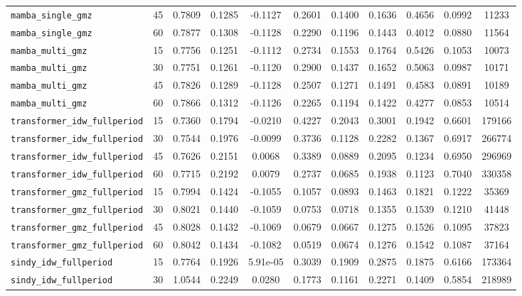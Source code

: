 \documentclass[12pt, a4paper]{article}
\begin{document}
{\begin{longtable}{p{4.0cm}cccccccccc}
\texttt{mamba\_single\_gmz} & 45 & 0.7809 & 0.1285 & -0.1127 & 0.2601 & 0.1400 & 0.1636 & 0.4656 & 0.0992 & 11233 \\
\texttt{mamba\_single\_gmz} & 60 & 0.7877 & 0.1308 & -0.1128 & 0.2290 & 0.1196 & 0.1443 & 0.4012 & 0.0880 & 11564 \\
\addlinespace[1pt]
\texttt{mamba\_multi\_gmz} & 15 & 0.7756 & 0.1251 & -0.1112 & 0.2734 & 0.1553 & 0.1764 & 0.5426 & 0.1053 & 10073 \\
\texttt{mamba\_multi\_gmz} & 30 & 0.7751 & 0.1261 & -0.1120 & 0.2900 & 0.1437 & 0.1652 & 0.5063 & 0.0987 & 10171 \\
\texttt{mamba\_multi\_gmz} & 45 & 0.7826 & 0.1289 & -0.1128 & 0.2507 & 0.1271 & 0.1491 & 0.4583 & 0.0891 & 10189 \\
\texttt{mamba\_multi\_gmz} & 60 & 0.7866 & 0.1312 & -0.1126 & 0.2265 & 0.1194 & 0.1422 & 0.4277 & 0.0853 & 10514 \\
\addlinespace[1pt]
\texttt{transformer\_idw\_fullperiod} & 15 & 0.7360 & 0.1794 & -0.0210 & 0.4227 & 0.2043 & 0.3001 & 0.1942 & 0.6601 & 179166 \\
\texttt{transformer\_idw\_fullperiod} & 30 & 0.7544 & 0.1976 & -0.0099 & 0.3736 & 0.1128 & 0.2282 & 0.1367 & 0.6917 & 266774 \\
\texttt{transformer\_idw\_fullperiod} & 45 & 0.7626 & 0.2151 & 0.0068 & 0.3389 & 0.0889 & 0.2095 & 0.1234 & 0.6950 & 296969 \\
\texttt{transformer\_idw\_fullperiod} & 60 & 0.7715 & 0.2192 & 0.0079 & 0.2737 & 0.0685 & 0.1938 & 0.1123 & 0.7040 & 330358 \\
\addlinespace[1pt]
\texttt{transformer\_gmz\_fullperiod} & 15 & 0.7994 & 0.1424 & -0.1055 & 0.1057 & 0.0893 & 0.1463 & 0.1821 & 0.1222 & 35369 \\
\texttt{transformer\_gmz\_fullperiod} & 30 & 0.8021 & 0.1440 & -0.1059 & 0.0753 & 0.0718 & 0.1355 & 0.1539 & 0.1210 & 41448 \\
\texttt{transformer\_gmz\_fullperiod} & 45 & 0.8028 & 0.1432 & -0.1069 & 0.0679 & 0.0667 & 0.1275 & 0.1526 & 0.1095 & 37823 \\
\texttt{transformer\_gmz\_fullperiod} & 60 & 0.8042 & 0.1434 & -0.1082 & 0.0519 & 0.0674 & 0.1276 & 0.1542 & 0.1087 & 37164 \\
\addlinespace[1pt]
\texttt{sindy\_idw\_fullperiod} & 15 & 0.7764 & 0.1926 & 5.91e-05 & 0.3039 & 0.1909 & 0.2875 & 0.1875 & 0.6166 & 173364 \\
\texttt{sindy\_idw\_fullperiod} & 30 & 1.0544 & 0.2249 & 0.0280 & 0.1773 & 0.1161 & 0.2271 & 0.1409 & 0.5854 & 218989 \\

\end{longtable}}
\end{document}
